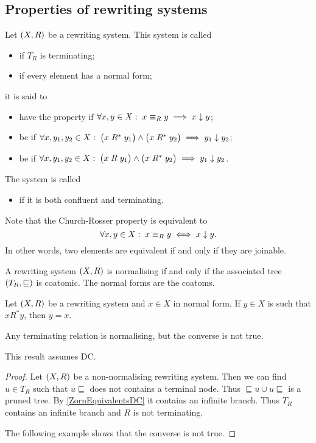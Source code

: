 \subsection{Properties of rewriting systems}
\begin{definition}
Let $\left( X, R \right)$ be a rewriting system. This system is called
\begin{itemize}
\item {} if $T_R$ is terminating;
\item {} if every element has a normal form;
\end{itemize}
it is said to
\begin{itemize}
\item have the  property if $\forall x,y\in X: \; x\mathrel{\equiv_R}y \implies x \mathrel{\downarrow} y$;
\item be  if $\forall x,y_1, y_2\in X: \; \big(x\mathrel{R^*}y_1\big) \land \big(x\mathrel{R^*}y_2\big) \implies y_1 \mathrel{\downarrow} y_2$;
\item be  if $\forall x,y_1, y_2\in X: \; \big(x\mathrel{R}y_1\big) \land \big(x\mathrel{R^*}y_2\big) \implies y_1 \mathrel{\downarrow} y_2$.
\end{itemize}
The system is called
\begin{itemize}
\item {} if it is both confluent and terminating.
\end{itemize}
\end{definition}
Note that the Church-Rosser property is equivalent to
\[ \forall x,y\in X: \; x\mathrel{\equiv_R}y \iff x \mathrel{\downarrow} y. \]
In other words, two elements are equivalent if and only if they are joinable.

A rewriting system $\left( X, R \right)$ is normalising if and only if the associated tree $\left( T_R, \sqsubseteq \right)$ is coatomic. The normal forms are the coatoms.

\begin{lemma} \label{successionNormalForm}
Let $\left( X,R \right)$ be a rewriting system and $x\in X$ in normal form. If $y\in X$ is such that $xR^*y$, then $y=x$. 
\end{lemma}

\begin{proposition}
Any terminating relation is normalising, but the converse is not true.
\end{proposition}
This result assumes DC.
\begin{proof}
Let $\left( X, R \right)$ be a non-normalising rewriting system. Then we can find $u\in T_R$ such that $u{\sqsubseteq}$ does not contains a terminal node. Thus ${\sqsubseteq}u \cup u{\sqsubseteq}$ is a pruned tree. By \ref{ZornEquivalentsDC} it contains an infinite branch. Thus $T_R$ contains an infinite branch and $R$ is not terminating.

The following example shows that the converse is not true.
\end{proof}

